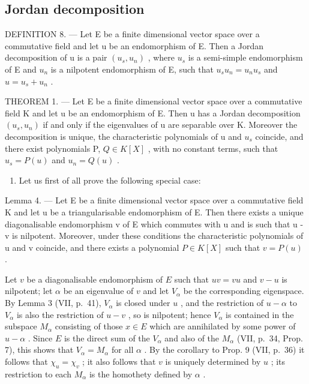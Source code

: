 \subsection{Jordan decomposition}

DEFINITION 8. --- Let E be a finite dimensional vector space over a commutative field and let u be an endomorphism of E. Then a Jordan decomposition of u is a pair \((u_{s}, u_{n})\) , where \(u_{s}\) is a semi-simple endomorphism of E and \(u_{n}\) is a nilpotent endomorphism of E, such that \(u_{s}u_{n} = u_{n}u_{s}\) and \(u = u_{s} + u_{n}\) .

THEOREM 1. --- Let E be a finite dimensional vector space over a commutative field K and let u be an endomorphism of E. Then u has a Jordan decomposition \((u_{s}, u_{n})\) if and only if the eigenvalues of u are separable over K. Moreover the decomposition is unique, the characteristic polynomials of u and \(u_{s}\) coincide, and there exist polynomials P, \(Q \in K[X]\) , with no constant terms, such that \(u_{s} = P(u)\) and \(u_{n} = Q(u)\) .

\begin{enumerate}
\def\labelenumi{\Alph{enumi})}
\tightlist
\item
  Let us first of all prove the following special case:
\end{enumerate}

Lemma 4. --- Let E be a finite dimensional vector space over a commutative field K and let u be a triangularisable endomorphism of E. Then there exists a unique diagonalisable endomorphism v of E which commutes with u and is such that u - v is nilpotent. Moreover, under these conditions the characteristic polynomials of u and v coincide, and there exists a polynomial \(P \in K[X]\) such that \(v = P(u)\) .

Let \(v\) be a diagonalisable endomorphism of \(E\) such that \(uv = vu\) and \(v - u\) is nilpotent; let \(\alpha\) be an eigenvalue of \(v\) and let \(V_{\alpha}\) be the corresponding eigenspace. By Lemma 3 (VII, p.~41), \(V_{\alpha}\) is closed under \(u\) , and the restriction of \(u - \alpha\) to \(V_{\alpha}\) is also the restriction of \(u - v\) , so is nilpotent; hence \(V_{\alpha}\) is contained in the subspace \(M_{\alpha}\) consisting of those \(x \in E\) which are annihilated by some power of \(u - \alpha\) . Since \(E\) is the direct sum of the \(V_{\alpha}\) and also of the \(M_{\alpha}\) (VII, p.~34, Prop. 7), this shows that \(V_{\alpha} = M_{\alpha}\) for all \(\alpha\) . By the corollary to Prop. 9 (VII, p.~36) it follows that \(\chi_u = \chi_v\) ; it also follows that \(v\) is uniquely determined by \(u\) ; its restriction to each \(M_{\alpha}\) is the homothety defined by \(\alpha\) .


